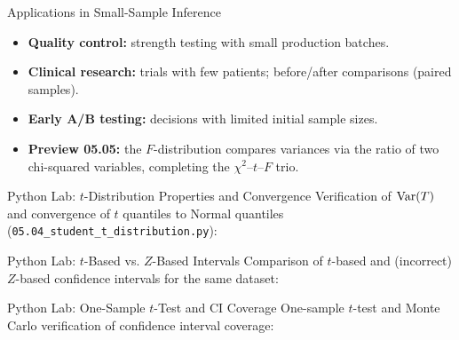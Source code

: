 \documentclass[aspectratio=169,xcolor={dvipsnames,table}]{beamer}
\begin{document}
\begin{frame}{Applications in Small-Sample Inference}
	\vspace{-0.1cm}
	\begin{itemize}\itemsep=0.1cm
		\item \textbf{Quality control:} strength testing with small production batches. \pause
		\item \textbf{Clinical research:} trials with few patients; before/after comparisons (paired samples). \pause
		\item \textbf{Early A/B testing:} decisions with limited initial sample sizes. \pause
		\item \textbf{Preview 05.05:} the $F$-distribution compares variances via the ratio of two chi-squared variables, completing the $\chi^2$--$t$--$F$ trio.
	\end{itemize}
\end{frame}

\begin{frame}[fragile]{Python Lab: $t$-Distribution Properties and Convergence}
	\vspace{-0.05cm}
	\scriptsize
	Verification of $\operatorname{Var}(T)$ and convergence of $t$ quantiles to Normal quantiles (\texttt{05.04\_student\_t\_distribution.py}):
	{
	}
\end{frame}

\begin{frame}[fragile]{Python Lab: $t$-Based vs. $Z$-Based Intervals}
	\vspace{-0.05cm}
	\scriptsize
	Comparison of $t$-based and (incorrect) $Z$-based confidence intervals for the same dataset:
	{
	}
\end{frame}

\begin{frame}[fragile]{Python Lab: One-Sample $t$-Test and CI Coverage}
	\vspace{-0.05cm}
	\scriptsize
	One-sample $t$-test and Monte Carlo verification of confidence interval coverage:
	{
	}
\end{frame}
\end{document}
